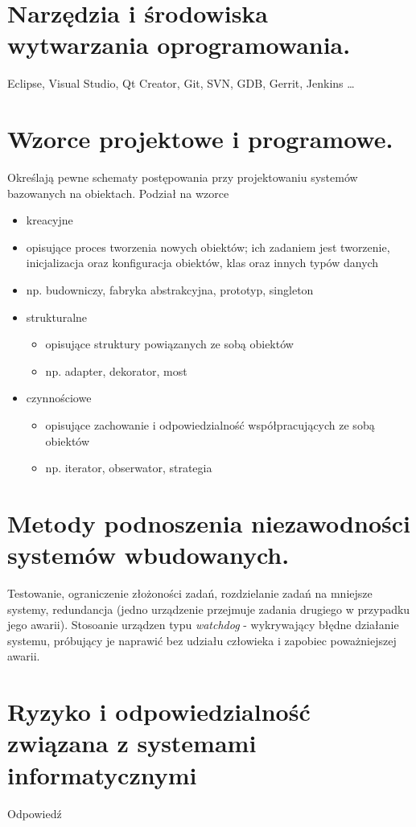 \documentclass[12pt,a4paper]{article}
\begin{document}
	\section{Narzędzia i środowiska wytwarzania oprogramowania.}
	Eclipse, Visual Studio, Qt Creator, Git, SVN, GDB, Gerrit, Jenkins \dots

	\section{Wzorce projektowe i programowe.}
	Określają pewne schematy postępowania przy projektowaniu systemów bazowanych na obiektach. Podział na wzorce
	\begin{itemize}
		\item kreacyjne
			\item opisujące proces tworzenia nowych obiektów; ich zadaniem jest tworzenie, inicjalizacja oraz konfiguracja obiektów, klas oraz innych typów danych
			\item np. budowniczy, fabryka abstrakcyjna, prototyp, singleton
		\item strukturalne
		\begin{itemize}
			\item opisujące struktury powiązanych ze sobą obiektów
			\item np. adapter, dekorator, most
		\end{itemize}
		\item czynnościowe
		\begin{itemize}
			\item opisujące zachowanie i odpowiedzialność współpracujących ze sobą obiektów
			\item np. iterator, obserwator, strategia
		\end{itemize}
	\end{itemize}

	\section{Metody podnoszenia niezawodności systemów wbudowanych.}
	Testowanie, ograniczenie złożoności zadań, rozdzielanie zadań na mniejsze systemy, redundancja (jedno urządzenie przejmuje zadania drugiego w przypadku jego awarii). Stosoanie urządzen typu \textit{watchdog} - wykrywający błędne działanie systemu, próbujący je naprawić bez udziału człowieka i zapobiec poważniejszej awarii.

	\section{Ryzyko i odpowiedzialność związana z systemami informatycznymi}
	Odpowiedź
\end{document}
